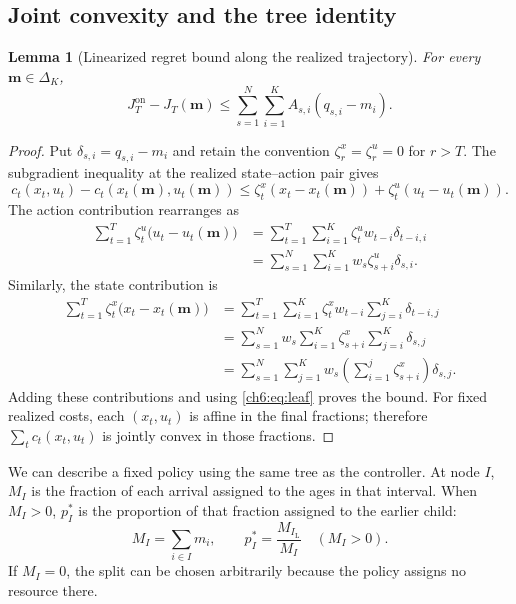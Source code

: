 \documentclass[11pt]{article}
\theoremstyle{plain}
\newtheorem{Thm:Lemma}[Thm:Theorem]{Lemma}
\theoremstyle{remark}
\numberwithin{equation}{section}
\begin{document}
\subsection{Joint convexity and the tree identity}
\begin{Thm:Lemma}[Linearized regret bound along the realized trajectory]\label{ch6:lem:joint}
For every $\mathbf m\in\Delta_K$,
\begin{equation}\label{ch6:eq:joint-compare}
 J_T^{\mathrm{on}}-J_T(\mathbf m)
 \le\sum_{s=1}^N\sum_{i=1}^KA_{s,i}(q_{s,i}-m_i).
\end{equation}
\end{Thm:Lemma}
\begin{proof}
Put $\delta_{s,i}=q_{s,i}-m_i$ and retain the convention
$\zeta_r^x=\zeta_r^u=0$ for $r>T$.  The subgradient inequality at the
realized state--action pair gives
\[
c_t(x_t,u_t)-c_t(x_t(\mathbf m),u_t(\mathbf m))
\le\zeta_t^x(x_t-x_t(\mathbf m))
+\zeta_t^u(u_t-u_t(\mathbf m)).
\]
The action contribution rearranges as
\begin{align*}
\sum_{t=1}^{T}\zeta_t^u\bigl(u_t-u_t(\mathbf m)\bigr)
&=\sum_{t=1}^{T}\sum_{i=1}^{K}
  \zeta_t^uw_{t-i}\delta_{t-i,i}\\
&=\sum_{s=1}^{N}\sum_{i=1}^{K}
  w_s\zeta_{s+i}^u\delta_{s,i}.
\end{align*}
Similarly, the state contribution is
\begin{align*}
\sum_{t=1}^{T}\zeta_t^x\bigl(x_t-x_t(\mathbf m)\bigr)
&=\sum_{t=1}^{T}\sum_{i=1}^{K}
  \zeta_t^xw_{t-i}\sum_{j=i}^{K}\delta_{t-i,j}\\
&=\sum_{s=1}^{N}w_s\sum_{i=1}^{K}
  \zeta_{s+i}^x\sum_{j=i}^{K}\delta_{s,j}\\
&=\sum_{s=1}^{N}\sum_{j=1}^{K}
  w_s\left(\sum_{i=1}^{j}\zeta_{s+i}^x\right)\delta_{s,j}.
\end{align*}
Adding these contributions and using \eqref{ch6:eq:leaf} proves the bound.
For fixed realized costs, each $(x_t,u_t)$ is affine in the final fractions;
therefore $\sum_t c_t(x_t,u_t)$ is jointly convex in those fractions.
\end{proof}

We can describe a fixed policy using the same tree as the controller.
At node $I$, $M_I$ is the fraction of each arrival assigned to the ages
in that interval. When $M_I>0$, $p_I^*$ is the proportion of that
fraction assigned to the earlier child:
\begin{equation}\label{ch6:eq:comparator-mass}
 M_I=\sum_{i\in I}m_i,\qquad
 p_I^*=\frac{M_{I_{\mathrm{L}}}}{M_I}\quad(M_I>0).
\end{equation}
If $M_I=0$, the split can be chosen arbitrarily because the policy assigns
no resource there.
\end{document}
